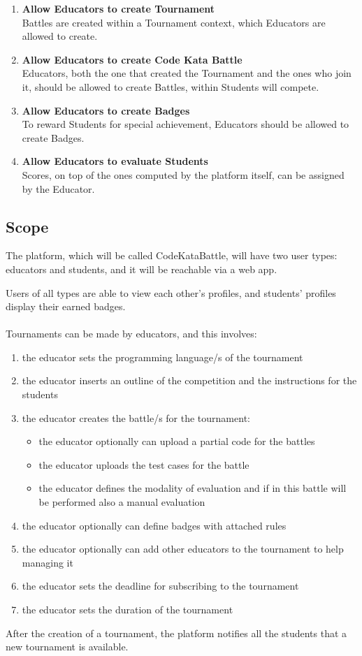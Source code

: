 \begin{enumerate}[label=$\bullet$ \textbf{GE\arabic*:}]
    \item \textbf{Allow Educators to create Tournament}\\Battles are created within a Tournament context, which Educators are allowed to create.
    \item \textbf{Allow Educators to create Code Kata Battle}\\Educators, both the one that created the Tournament and the ones who join it, should be allowed to create Battles, within Students will compete.
    \item \textbf{Allow Educators to create Badges}\\To reward Students for special achievement, Educators should be allowed to create Badges.
    \item \textbf{Allow Educators to evaluate Students}\\Scores, on top of the ones computed by the platform itself, can be assigned by the Educator.
\end{enumerate}

\subsection{Scope}
The platform, which will be called CodeKataBattle, will have two user types: educators and students, and it will be reachable via a web app.

Users of all types are able to view each other's profiles, and students' profiles display their earned badges.\\
\\
Tournaments can be made by educators, and this involves:
\begin{enumerate}[label=$\bullet$]
    \item the educator sets the programming language/s of the tournament
    \item the educator inserts an outline of the competition and the instructions for the students
    \item the educator creates the battle/s for the tournament:
    \begin{itemize}
        \item the educator optionally can upload a partial code for the battles
        \item the educator uploads the test cases for the battle
        \item the educator defines the modality of evaluation and if in this battle will be performed also a manual evaluation
    \end{itemize}
    \item the educator optionally can define badges with attached rules
    \item the educator optionally can add other educators to the tournament to help managing it
    \item the educator sets the deadline for subscribing to the tournament
    \item the educator sets the duration of the tournament
\end{enumerate}
After the creation of a tournament, the platform notifies all the students that a new tournament is available.

